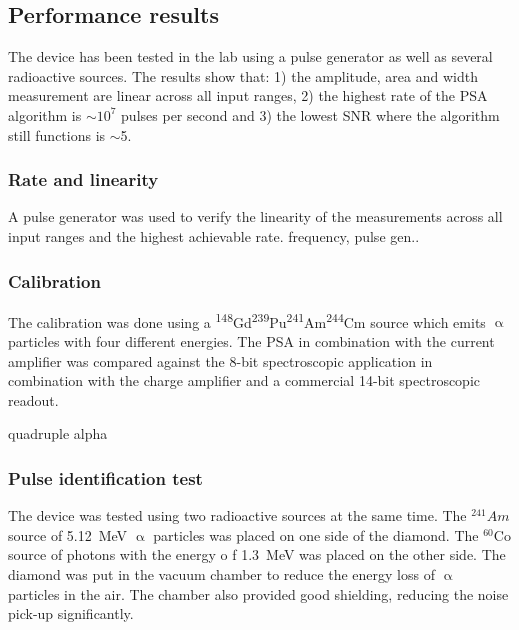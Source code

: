 \documentclass[12pt]{mytustyle}  %
\begin{document}
\clearpage\clearpage
\subsection{Performance results}
The device has been tested in the lab using a pulse generator as well as several radioactive sources. The results show that: 1) the amplitude, area and width measurement are linear across all input ranges, 2) the highest rate of the PSA algorithm is $\sim10^7$ pulses per second and 3) the lowest SNR where the algorithm still functions is $\sim$5.  

\subsubsection{Rate and linearity}
A pulse generator was used to verify the linearity of the measurements across all input ranges and the highest achievable rate. 
frequency, pulse gen..

\subsubsection{Calibration}
The calibration was done using a \textsuperscript{148}Gd\textsuperscript{239}Pu\textsuperscript{241}Am\textsuperscript{244}Cm source which emits $\upalpha$ particles with four different energies. The PSA in combination with the current amplifier was compared against the 8-bit spectroscopic application in combination with the charge amplifier and a commercial 14-bit spectroscopic readout.

quadruple alpha

\subsubsection{Pulse identification test}
The device was tested using two radioactive sources at the same time. The $^{241}Am$ source of 5.12~MeV $\upalpha$ particles was placed on one side of the diamond. The $^{60}$Co source of photons with the energy o f 1.3~MeV was placed on the other side. The diamond was put in the vacuum chamber to reduce the energy loss of $\upalpha$ particles in the air. The chamber also provided good shielding, reducing the noise pick-up significantly. 
\end{document}
